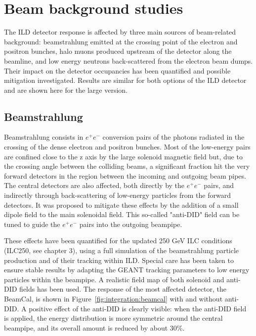 \section{Beam background studies}
\label{ild:sec:beam_backgrounds}
The ILD detector response is affected by three main sources of beam-related background: beamstrahlung emitted at the crossing point of the electron and positron bunches, halo muons produced upstream of the detector along the beamline, and low energy neutrons back-scattered from the electron beam dumps. Their impact on the detector occupancies has been quantified and possible mitigation investigated. Results are similar for both options of the ILD detector and are shown here for the large version.

\subsection{Beamstrahlung}

Beamstrahlung consists in $e^+e^-$ conversion pairs of the photons radiated in the crossing of the dense electron and positron bunches. Most of the low-energy pairs are confined close to the z axis by the large solenoid magnetic field but, due to the crossing angle between the colliding beams, a significant fraction hit the very forward detectors in the region between the incoming and outgoing beam pipes. The central detectors are also affected, both directly by the $e^+e^-$ pairs, and indirectly through back-scattering of low-energy particles from the forward detectors. It was proposed to mitigate these effects by the addition of a small dipole field to the main solenoidal field. This so-called "anti-DID" field can be tuned to guide the $e^+e^-$ pairs into the outgoing beampipe. 

These effects have been quantified for the updated 250 GeV ILC conditions (ILC250, see chapter 3), using a full simulation of the beamstrahlung particle production and of their tracking within ILD. Special care has been taken to ensure stable results by adapting the GEANT tracking parameters to low energy particles within the beampipe. A realistic field map of both solenoid and anti-DID fields has been used. The response of the most affected detector, the BeamCal, is shown in Figure~\ref{fig:integration:beamcal} with and without anti-DID. A positive effect of the anti-DID is clearly visible: when the anti-DID field is applied, the energy distribution is more symmetric around the central beampipe, and its overall amount is reduced by about 30\%.

